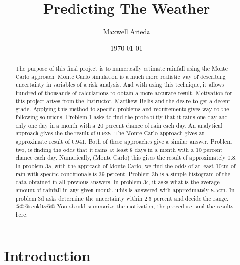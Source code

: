\documentclass[twocolumn]{revtex4}
\begin{document}
\title{
Predicting The Weather
}

\author{Maxwell Arieda}

\date{\today}

\begin{abstract}
The purpose of this final project is to numerically estimate rainfall using the Monte Carlo approach. Monte Carlo simulation is a  much more realistic way of describing uncertainty in variables of a risk analysis. And with using this technique, it allows hundred of thousands of calculations to obtain a more accurate result. Motivation for this project arises from the Instructor, Matthew Bellis and the desire to get a decent grade. 
Applying this method to specific problems and requirements gives way to the following solutions. Problem 1 asks to find the probability that it rains one day and only one day in a month with a 20 percent chance of rain each day. An analytical approach gives the the result of 0.928. The Monte Carlo approach gives an approximate result of 0.941. Both of these approaches give a similar answer. Problem two, is finding the odds that it rains at least 8 days in a month with a 10 percent chance each day. Numerically, (Monte Carlo) this  gives the result of approximately 0.8. In problem 3a, with the approach of Monte Carlo, we find the odds of at least 10cm of rain with specific conditionals is 39 percent. Problem 3b is a simple histogram of the data obtained in all previous answers. In problem 3c, it asks what is the average amount of rainfall in any given month. This is answered with approximately 8.5cm. In problem 3d asks determine the uncertainty within 2.5 percent and decide the range. @@@reuklts@@
    You should summarize the motivation, the procedure, and the 
    results here.
\end{abstract}

\maketitle

\section{Introduction}
\end{document}
